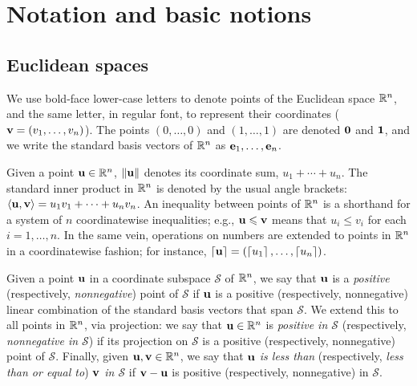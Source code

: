 \documentclass[11pt]{amsart}
\begin{document}




\newpage
\section{Notation and basic notions}


\subsection{Euclidean spaces}
\label{ss: euclidean spaces and convexity}
We use bold-face lower-case letters to denote points of the Euclidean space $\mathbb{R}^n$, and the same letter, in regular font, to represent their coordinates (\eg $\mathbf{v}=(v_1,\ldots,v_n)$).
The points $(0,\ldots,0)$ and $(1,\ldots,1)$ are denoted $\mathbf{0}$ and $\mathbf{1}$, and we write the standard basis vectors of $\mathbb{R}^n$ as $\mathbf{e}_1,\ldots,\mathbf{e}_n$.

Given a point $\mathbf{u}\in \mathbb{R}^n$, $\| \mathbf{u} \|$ denotes its coordinate sum, $u_1+\cdots+u_n$.
The standard inner product in $\mathbb{R}^n$ is denoted by the usual angle brackets: $\langle \mathbf{u}, \mathbf{v} \rangle = u_1v_1 + \cdots + u_nv_n$.
An inequality between points of $\mathbb{R}^n$ is a shorthand for a system of $n$ coordinatewise inequalities; e.g., $\mathbf{u}\leqslant \mathbf{v}$ means that $u_i \le v_i$ for each $i=1,\ldots,n$.
In the same vein, operations on numbers are extended to points in $\mathbb{R}^n$ in a coordinatewise fashion; for instance, $\left\lceil \mathbf{u} \right\rceil=(\left\lceil u_1 \right\rceil,\ldots,\left\lceil u_n \right\rceil)$.

Given a point $\mathbf{u}$ in a coordinate subspace $\mathcal{S}$ of $\mathbb{R}^n$, we say that $\mathbf{u}$ is a \emph{positive} (respectively, \emph{nonnegative}) point of $\mathcal{S}$ if $\mathbf{u}$ is a positive (respectively, nonnegative) linear combination of the standard basis vectors that span $\mathcal{S}$.
We extend this to all points in $\mathbb{R}^n$, via projection: we say that $\mathbf{u} \in \mathbb{R}^n$ is \emph{positive in $\mathcal{S}$} (respectively, \emph{nonnegative in $\mathcal{S}$}) if its projection on $\mathcal{S}$ is a positive (respectively, nonnegative) point of $\mathcal{S}$. 
Finally, given $\mathbf{u},\mathbf{v}\in \mathbb{R}^n$, we say that \emph{$\mathbf{u}$ is less than} (respectively, \emph{less than or equal to}) \emph{$\mathbf{v}$ in $\mathcal{S}$} if $\mathbf{v}-\mathbf{u}$ is positive (respectively, nonnegative) in $\mathcal{S}$.
\end{document}
